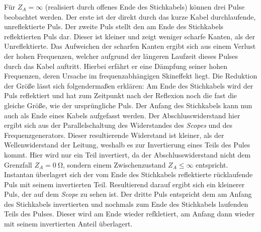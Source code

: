 \documentclass[a4paper,twoside,final]{article}
\begin{document}
Für $Z_A = \infty$ (realisiert durch offenes Ende des Stichkabels) können drei Pulse beobachtet werden. Der erste ist der direkt durch das kurze Kabel durchlaufende, unreflektierte Puls. Der zweite Puls stellt den am Ende des Stichkabels reflektierten Puls dar. Dieser ist kleiner und zeigt weniger scharfe Kanten, als der Unreflektierte. Das Aufweichen der scharfen Kanten ergibt sich aus einem Verlust der hohen Frequenzen, welcher aufgrund der längeren Laufzeit dieses Pulses durch das Kabel auftritt. Hierbei erfährt er eine Dämpfung seiner hohen Frequenzen, deren Ursache im frequenzabhängigen Skineffekt liegt. Die Reduktion der Größe lässt sich folgendermaßen erklären: Am Ende des Stichkabels wird der Puls reflektiert und hat zum Zeitpunkt nach der Reflexion noch die fast die gleiche Größe, wie der ursprüngliche Puls. Der Anfang des Stichkabels kann nun auch als Ende eines Kabels aufgefasst werden. Der Abschlusswiderstand hier ergibt sich aus der Parallelschaltung des Widerstandes des \textit{Scopes} und des Frequenzgenerators. Dieser resultierende Widerstand ist kleiner, als der Wellenwiderstand der Leitung, weshalb es zur Invertierung eines Teils des Pules kommt. Hier wird nur ein Teil invertiert, da der Abschlusswiderstand nicht dem Grenzfall $Z_A = \SI{0}{\ohm}$, sondern einem Zwischenzustand $Z_A \leq \infty$ entspricht. Instantan überlagert sich der vom Ende des Stichkabels reflektierte rücklaufende Puls mit seinem invertierten Teil. Resultierend darauf ergibt sich ein kleinerer Puls, der auf dem \textit{Scope} zu sehen ist. Der dritte Puls entspricht dem am Anfang des Stichkabels invertierten und nochmals zum Ende des Stichkabels laufenden Teils des Pulses. Dieser wird am Ende wieder refkletiert, am Anfang dann wieder mit seinem invertierten Anteil überlagert.
\end{document}
